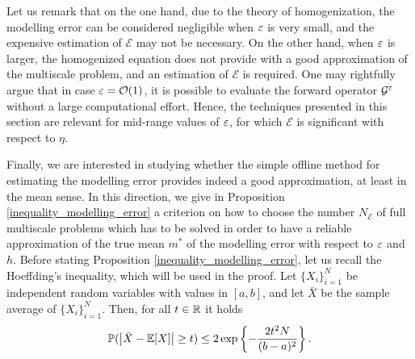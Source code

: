\documentclass[10pt]{article}
\begin{document}
\begin{remark}
\label{remark_modelling_error}
Let us remark that on the one hand, due to the theory of homogenization, the modelling error can be considered negligible when $\varepsilon$ is very small, and the expensive estimation of $\mathcal E$ may not be necessary. On the other hand, when $\varepsilon$ is larger, the homogenized equation does not provide with a good approximation of the multiscale problem, and an estimation of $\mathcal E$ is required. One may rightfully argue that in case $\varepsilon = \mathcal O(1)$, it is possible to evaluate the forward operator $\mathcal G^\varepsilon$ without a large computational effort. Hence, the techniques presented in this section are relevant for mid-range values of $\varepsilon$, for which $\mathcal E$ is significant with respect to $\eta$.
\end{remark}

Finally, we are interested in studying whether the simple offline method for estimating the modelling error provides indeed a good approximation, at least in the mean sense. In this direction, we give in Proposition \ref{inequality_modelling_error} a criterion on how to choose the number $N_{\mathcal{E}}$ of full multiscale problems which has to be solved in order to have a reliable approximation of the true mean $m^*$ of the modelling error with respect to $\varepsilon$ and $h$. Before stating Proposition \ref{inequality_modelling_error}, let us recall the Hoeffding's inequality, which will be used in the proof. Let $\{ X_i \}_{i=1}^N$ be independent random variables with values in $[a,b]$, and let $\bar{X}$ be the sample average of $\{X_i\}_{i=1}^N$. Then, for all $t \in \mathbb{R}$ it holds
\[ \mathbb{P} (\left\lvert\bar{X} - \mathbb{E}[X]\right\rvert \ge t) \le 2 \exp \left \{ - \frac{2 t^2 N}{(b-a)^2} \right \}. \]
\end{document}
